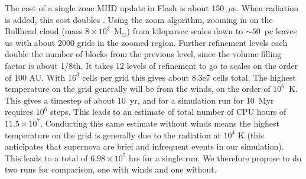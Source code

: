 \documentclass[11pt]{article}
\newcommand{\msun}{$\textrm{M}_{\odot}$}
\begin{document}

The cost of a single zone MHD update in Flash is about 150~$\mu$s. When radiation is added, this cost doubles \citep{WiseAbel2011}. Using the zoom algorithm, zooming in on the Bullhead cloud (mass $8 \times 10^3$~{\msun}) from kiloparsec scales down to $\sim50$~pc leaves us with about 2000 grids in the zoomed region. Further refinement levels each double the number of blocks from the previous level, since the volume filling factor is about 1/8th. It takes 12 levels of refinement to go to scales on the order of 100 AU. With $16^3$ cells per grid this gives about 8.3e7 cells total. The highest temperature on the grid generally will be from the winds, on the order of $10^6$~K. This gives a timestep of about 10~yr, and for a simulation run for 10~Myr requires $10^6$ steps. This leads to an estimate of total number of CPU hours of $11.5 \times 10^7$. Conducting this same estimate without winds means the highest temperature on the grid is generally due to the radiation at $10^4$ K (this anticipates that supernova are brief and infrequent events in our simulation). This leads to a total of $6.98 \times 10^5$ hrs for a single run. We therefore propose to do two runs for comparison, one with winds and one without.




\end{document}
